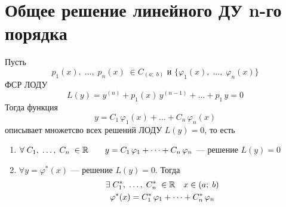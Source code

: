 \author{Tkachuk Andrey}

\section{Общее решение линейного ДУ n-го порядка}

\begin{Th}
    Пусть
    \[
        p_1(x),\; \dots,\; p_n(x)\; \in C_{(a;\;b)} \text{ и } \{\varphi_1(x),\; \dots,\; \varphi_n(x)\}
    \]
    ФСР ЛОДУ
    \[
        L(y) = y^{(n)} + p_1(x)\,y^{(n-1)} + \dots + p_1\,y = 0
    \]
    Тогда функция 
    \[
        y = C_1\,\varphi_1(x) + \dots + C_n\,\varphi_n(x)
    \]
    описывает множетсво всех решений ЛОДУ $L(y) = 0$, то есть
    \begin{enumerate}
        \item $\forall\;C_1,\; \dots,\; C_n\;\in \mathbb{R} \qquad y = C_1\,\varphi_1 + \dots + C_n\,\varphi_n$ --- решение $L(y) = 0$ 
        \item $\forall y = \varphi^*(x)$ --- решение $L(y) = 0$. Тогда
        \begin{gather*}
            \exists \; C_1^*,\; \dots,\; C_n^*\; \in \mathbb{R} \quad x\in(a;\;b)\\
            \varphi^*(x) = C_1^*\,\varphi_1 + \dots + C_n^*\,\varphi_n
        \end{gather*}
    \end{enumerate}
\end{Th}

